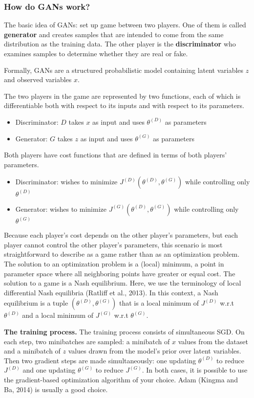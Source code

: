 \subsubsection{How do GANs work?}
The basic idea of GANs: set up game between two players. One of them is called \textbf{generator} and creates samples that are intended to come from the same distribution as the training data. The other player is the \textbf{discriminator} who examines samples to determine whether they are real or fake.

Formally, GANs are a structured probabilistic model containing latent variables $z$ and observed variables $x$. 


The two players in the game are represented by two functions, each of which is differentiable both with respect to its inputs and with respect to its parameters.
\begin{itemize}
	\item
		Discriminator: $D$ takes $x$ as input and uses $\theta^{(D)}$ as parameters
	\item
		Generator: $G$ takes $z$ as input and uses $\theta^{(G)}$ as parameters
\end{itemize}

Both players have cost functions that are defined in terms of both players’ parameters.
\begin{itemize}
	\item
		Discriminator: wishes to minimize $J^{(D)}(\theta^{(D)},\theta^{(G)})$ while controlling only $\theta^{(D)}$
	\item
		Generator: wishes to minimize $J^{(G)}(\theta^{(D)},\theta^{(G)})$ while controlling only $\theta^{(G)}$
\end{itemize}


Because each player's cost depends on the other player’s parameters, but each player cannot control the other player’s parameters, this scenario is most straightforward to describe as a game rather than as an optimization problem. The solution to an optimization problem is a (local) minimum, a point in parameter space where all neighboring points have greater or equal cost. The solution to a game is a Nash equilibrium. Here, we use the terminology of local differential Nash equilibria
(Ratliff et al., 2013). In this context, a Nash equilibrium is a tuple $(\theta^{(D)},\theta^{(G)})$ that is a local minimum of $J^{(D)}$ w.r.t $\theta^{(D)}$ and a local minimum of $J^{(G)}$ w.r.t $\theta^{(G)}$.

\textbf{The training process.} The training process consists of simultaneous SGD. On each step, two minibatches are sampled: a minibatch of $x$ values from the
dataset and a minibatch of $z$ values drawn from the model’s prior over latent
variables. Then two gradient steps are made simultaneously: one updating $\theta^{(D)}$ to reduce $J^{(D)}$ and one updating $\theta^{(G)}$ to reduce $J^{(G)}$. In both cases, it is possible to use the gradient-based optimization algorithm of your choice. Adam (Kingma and Ba, 2014) is usually a good choice.

